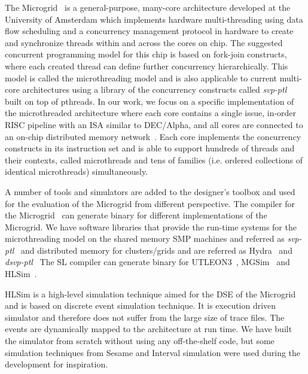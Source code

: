 \documentclass{article}
\begin{document}
The
Microgrid~\cite{conf:hpc:Jesshope04,Bernard:2010:RPM:2031978.2031994,JesshopeAPC08}
is a general-purpose, many-core architecture developed at the University of
Amsterdam which implements hardware multi-threading using data flow scheduling
and a concurrency management protocol in hardware to create and synchronize
threads within and across the cores on chip. The suggested concurrent
programming model for this chip is based on fork-join constructs, where each
created thread can define further concurrency hierarchically. This model is
called the microthreading model and is also applicable to current multi-core
architectures using a library of the concurrency constructs called
\emph{svp-ptl} ~\cite{SVP-PTL2009} built on top of pthreads. In our work, we
focus on a specific implementation of the microthreaded architecture where each
core contains a single issue, in-order RISC pipeline with an ISA similar to
DEC/Alpha, and all cores are connected to an on-chip distributed memory
network~\cite{Jesshope:2009:ISM:1577129.1577136,Bousias:2009:IEM:1517865.1518255}.
Each core implements the concurrency constructs in its instruction set and is
able to support hundreds of threads and their contexts, called microthreads and
tens of families (i.e. ordered collections of identical microthreads)
simultaneously.

A number of tools and simulators are added to the designer's toolbox and used
for the evaluation of the Microgrid from different perspective. The compiler
for the Microgrid~\cite{poss.12.sl} can generate binary for different
implementations of the Microgrid. We have software libraries that provide the
run-time systems for the microthreading model on the shared memory SMP machines
and referred as \emph{svp-ptl}~\cite{SVP-PTL2009} and distributed memory for
clusters/grids and are referred as Hydra~\cite{Andrei:msc_hydra:2010} and
\emph{dsvp-ptl}~\cite{DSVP-PTL2011} The SL compiler can generate binary for
UTLEON3~\cite{5491777,danek.12},
MGSim~\cite{Bousias:2009:IEM:1517865.1518255,poss.13.MGSim.SAMOS} and
HLSim~\cite{Irfan:multipe_levels_hlsim:2013, Irfan:oneipc_hlsim:2013,
Irfan.12.2013.signatures, Irfan.12.2013.CacheBased, Irfan.01.2014.analytical,
Irfan:hl_sim_ptl:2011, Irfan:msc_hlsim:2009, Uddin:2012:CSM:2162131.2162132}.

HLSim is a high-level simulation technique aimed for the DSE of the Microgrid
and is based on discrete event simulation technique. It is execution driven
simulator and therefore does not suffer from the large size of trace files. The
events are dynamically mapped to the architecture at run time. We have built
the simulator from scratch without using any off-the-shelf code, but
some simulation techniques from Sesame and Interval simulation were used during the
development for inspiration.
\end{document}
